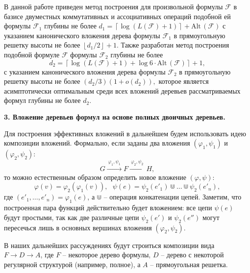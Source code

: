 \documentclass[12pt, a4paper]{article}
\theoremstyle{plain}
\theoremstyle{definition}
\theoremstyle{definition}
\newcommand{\Min}{\min\limits}
\newcommand{\floor}[1]{\left\lfloor{#1}\right\rfloor}
\newcommand{\ceil}[1]{\left\lceil{#1}\right\rceil}
\renewcommand{\phi}{\varphi}
\newcommand{\Alt}{\mathrm{Alt}\,}
\newcommand{\F}{\mathscr{F}}
\begin{document}
В данной работе приведен метод построения для произвольной 
формулы $\F$ в базисе двуместных коммутативных и ассоциативных
операций подобной ей формулы $\F_1$ глубины
не более $d_1 = \ceil{\log (L(\F) + 1)} + \Alt(\F)$
с указанием канонического вложения дерева формулы $\F_1$ в прямоугольную решетку высоты не более
$
	\floor{d_1 / 2} + 1.
$
Также разработан метод построения подобной формуле $\F$ формулы $\F_2$ глубины 
не более 
\[
	d_2 = \ceil{\log (L(\F) + 1) + \log  6 \cdot \Alt(\F)} + 1,
\]
с указанием канонического вложения дерева формулы $\F_2$ в прямоугольную решетку высоты не более
$
	(d_2/3)(1 + o(d_2)),
$
которое является асимптотически оптимальным среди всех вложений деревьев рассматриваемых формул глубины не более $d_2$.
%


\bigskip

{\bfseries 3. Вложение деревьев формул на основе полных двоичных деревьев.}

Для построения эффективных вложений в дальнейшем будем
использовать идею композиции вложений. Формально, если 
заданы два вложения $(\phi_1, \psi_1)$ и $(\phi_2, \psi_2)$:
\[
	G \xrightarrow{~\phi_1, \psi_1~} F \xrightarrow{~\phi_2, \psi_2~} H,
\]
то можно естественным образом определить новое вложение $(\phi, \psi)$:
\[
\phi(v) = \phi_2(\phi_1(v)), ~~~ \psi(e) = \psi_2(e'_1) \Cup \dots\Cup\psi_2(e'_n),
\]
где $(e'_1, \dots, e'_n) = \phi_1(e)$, а $\Cup$ -- операция конкатенации цепей. 
Заметим, что построенная пара функций действительно будет вложением: все цепи $\psi(e)$ будут простыми, так как две различные цепи $\psi_2(e')$ и $\psi_2(e'')$ могут пересечься
лишь в основных вершинах вложения $(\phi_2, \psi_2)$.

В наших дальнейших рассуждениях будут строиться композиции
вида $F \rightarrow D \rightarrow A$, где $F$ -- некоторое дерево формулы, $D$ -- дерево с некоторой регулярной структурой (например, полное), а $A$ -- прямоугольная решетка.
\end{document}
